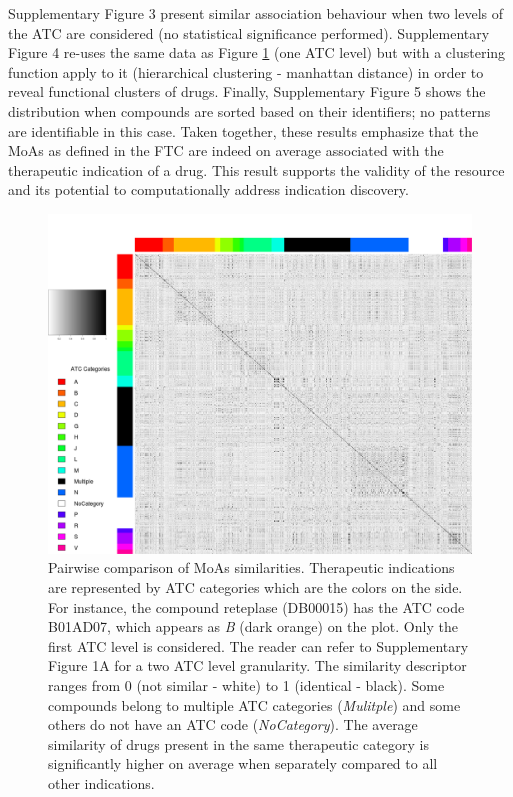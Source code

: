\documentclass{bioinfo}
\begin{document}
Supplementary Figure 3 present similar association behaviour when two levels of the ATC are 
considered (no statistical significance performed). Supplementary Figure 4 re-uses the same data as Figure \ref{fig:04} (one ATC level) 
but with a clustering function apply to it (hierarchical clustering - manhattan distance) in order to reveal 
functional clusters of drugs. Finally, Supplementary Figure 5 shows the distribution when compounds are sorted based on 
their identifiers; no patterns are identifiable in this case. Taken together, these results emphasize that the MoAs as 
defined in the FTC are indeed on average associated with the therapeutic indication of a drug. This result supports the validity of the
resource and its potential to computationally address indication discovery.

\begin{figure}[!tpb]%
\centerline{\includegraphics{fig4.png}}
\caption{Pairwise comparison of MoAs similarities. Therapeutic indications are represented by ATC categories which are the colors on the side.
For instance, the compound reteplase (DB00015) has the ATC code B01AD07, 
which appears as \emph{B} (dark orange) on the plot.
Only the first ATC level 
is considered. The reader can refer to Supplementary Figure 1A for a two ATC level granularity. 
The similarity descriptor ranges from 0 (not similar - white) to 1 (identical - black).
Some compounds belong to multiple ATC categories (\emph{Mulitple}) and some others do not have
an ATC code (\emph{NoCategory}).
The average similarity of drugs present in the same therapeutic category 
is significantly higher on average when separately compared to all other indications.}\label{fig:04}
\end{figure}
\end{document}
